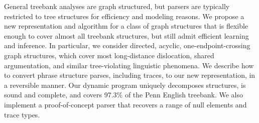 General treebank analyses are graph structured, but parsers are typically restricted to tree structures for efficiency and modeling reasons. We propose a new representation and algorithm for a class of graph structures that is flexible enough to cover almost all treebank structures, but still admit efficient learning and inference. In particular, we consider directed, acyclic, one-endpoint-crossing graph structures, which cover most long-distance dislocation, shared argumentation, and similar tree-violating linguistic phenomena. We describe how to convert phrase structure parses, including traces, to our new representation, in a reversible manner. Our dynamic program uniquely decomposes structures, is sound and complete, and covers 97.3\% of the Penn English treebank. We also implement a proof-of-concept parser that recovers a range of null elements and trace types.
